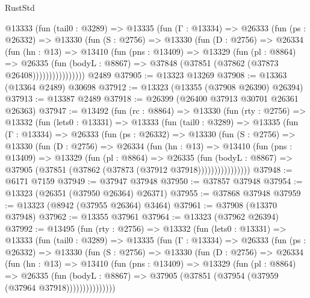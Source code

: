 \begin{lexlean}{RustStd}
\begin{coremodule}
          @13333
            (fun (tail0 : @3289) =>
            @13335
              (fun (Γ : @13334) =>
              @26333
                (fun (ps : @26332) =>
                @13330
                  (fun (S : @2756) =>
                  @13330
                    (fun (D : @2756) =>
                    @26334
                      (fun (hn : @13) =>
                      @13410
                        (fun (pns : @13409) =>
                        @13329
                          (fun (pl : @8864) =>
                          @26335
                            (fun (bodyL : @8867) =>
                            @37848 (@37851 (@37862 (@37873 @26408))))))))))))))))
    @2489
@37905 := @13323 @13269
@37908 := @13363 (@13364 @2489) @30698
@37912 := @13323 (@13355 (@37908 @26390) @26394)
@37913 := @13387 @2489
@37918 := @26399 (@26400 @37913 @30701 @26361 @26363)
@37947 := @13492
    (fun (rc : @8864) =>
    @13330
      (fun (rty : @2756) =>
      @13332
        (fun (lets0 : @13331) =>
        @13333
          (fun (tail0 : @3289) =>
          @13335
            (fun (Γ : @13334) =>
            @26333
              (fun (ps : @26332) =>
              @13330
                (fun (S : @2756) =>
                @13330
                  (fun (D : @2756) =>
                  @26334
                    (fun (hn : @13) =>
                    @13410
                      (fun (pns : @13409) =>
                      @13329
                        (fun (pl : @8864) =>
                        @26335
                          (fun (bodyL : @8867) =>
                          @37905 (@37851 (@37862 (@37873 (@37912 @37918))))))))))))))))
@37948 := @6171 @7159
@37949 := @37947 @37948
@37950 := @37857 @37948
@37954 := @13323 (@26351 (@37950 @26364) @26371)
@37955 := @37868 @37948
@37959 := @13323 (@8942 (@37955 @26364) @3464)
@37961 := @37908 (@13370 @37948)
@37962 := @13355 @37961
@37964 := @13323 (@37962 @26394)
@37992 := @13495
    (fun (rty : @2756) =>
    @13332
      (fun (lets0 : @13331) =>
      @13333
        (fun (tail0 : @3289) =>
        @13335
          (fun (Γ : @13334) =>
          @26333
            (fun (ps : @26332) =>
            @13330
              (fun (S : @2756) =>
              @13330
                (fun (D : @2756) =>
                @26334
                  (fun (hn : @13) =>
                  @13410
                    (fun (pns : @13409) =>
                    @13329
                      (fun (pl : @8864) =>
                      @26335
                        (fun (bodyL : @8867) =>
                        @37905 (@37851 (@37954 (@37959 (@37964 @37918)))))))))))))))

\end{coremodule}
\end{lexlean}
